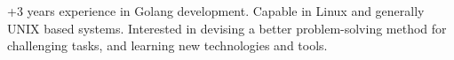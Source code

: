 

\begin{cvparagraph}

+3 years experience in Golang development. Capable in Linux and generally UNIX based systems. Interested in devising a better problem-solving method for challenging tasks, and learning new technologies and tools. 
\end{cvparagraph}
